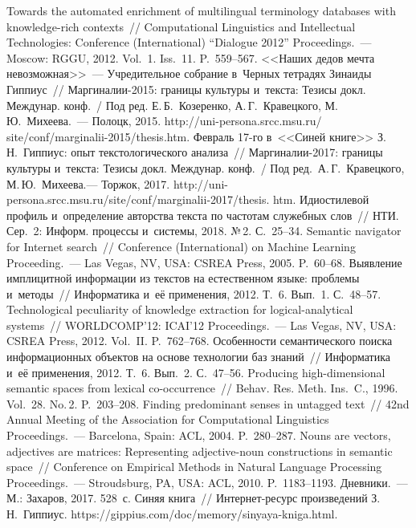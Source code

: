 \begin{multicols}{2}
{{\begin{thebibliography}{99}
 Towards the automated enrichment of multilingual terminology databases 
with knowledge-rich contexts~// Computational Linguistics and Intellectual Technologies: 
Conference (International) ``Dialogue 2012'' Proceedings.~---  Moscow: RGGU, 2012. Vol.~1. 
Iss.~11. P.~559--567. 
 <<Наших дедов мечта невозможная>>~--- Учредительное собрание 
в~Черных тетрадях Зинаиды Гиппиус~// Мар\-ги\-на\-лии-2015: границы культуры 
и~текста: Тезисы докл. Междунар. конф.~/
Под ред. Е.\,Б.~Козеренко, А.\,Г.~Кравецкого, М.\,Ю.~Ми\-хе\-ева.~--- 
Полоцк, 2015. {\sf http://uni-persona.srcc.msu.ru/ site/conf/marginalii-2015/thesis.htm}.
 Февраль 17-го в~<<Синей книге>> З.\,Н.~Гиппиус: опыт 
текстологического анализа~// Мар\-ги\-на\-лии-2017: границы культуры и~текста: Тезисы 
докл. Междунар. конф.~/
Под ред.\ А.\,Г.~Кра\-вец\-ко\-го, М.\,Ю.~Ми\-хе\-ева.--- Торжок, 
2017. {\sf http://uni-\linebreak persona.srcc.msu.ru/site/conf/marginalii-2017/thesis. htm}.
 Идиостилевой профиль и~определение авторства текста 
по частотам служебных слов~// НТИ. Сер.~2: Информ. процессы и~системы, 2018. №\,2. 
С.~25--34.
 Semantic navigator for Internet 
search~// Conference (International) on Machine Learning Proceeding.~--- Las 
Vegas, NV, USA: CSREA Press, 2005. P.~60--68.
 Выявление имплицитной информации из текстов на 
естественном языке: проб\-ле\-мы и~методы~// Информатика и~её применения, 2012. Т.~6. 
Вып.~1. С.~48--57.
 Technological peculiarity of 
knowledge extraction for logical-analytical systems~// WORLDCOMP'12: ICAI'12 
Proceedings.~--- Las Vegas, NV, USA: CSREA Press, 2012. Vol.~II. P.~762--768.
 Особенности семантического поиска 
информационных объектов на основе технологии баз знаний~// Информатика и~её 
применения, 2012. Т.~6. Вып.~2. С.~47--56.
 Producing high-dimensional semantic spaces from lexical  
co-occurrence~// Behav. Res. Meth. Ins.~C., 1996. Vol.~28. 
No.\,2. P.~203--208.
 Finding predominant senses in untagged 
text~// 42nd Annual Meeting of the Association for Computational Linguistics Proceedings.~--- 
Barcelona, Spain: ACL, 2004. P.~280--287.
 Nouns are vectors, adjectives are matrices: Representing 
adjective-noun constructions in semantic space~// Conference on Empirical Methods in 
Natural Language Processing Proceedings.~--- Stroudsburg, PA, USA: ACL, 2010.  
P.~1183--1193.
 Дневники.~--- М.: Захаров, 2017. 528~с.
Синяя книга~// Ин\-тер\-нет-ре\-сурс произведений З.\,Н.~Гип\-пи\-ус. {\sf 
https://gippius.com/doc/memory/\linebreak sinyaya-kniga.html}.
 \end{thebibliography}

}}
\end{multicols}
